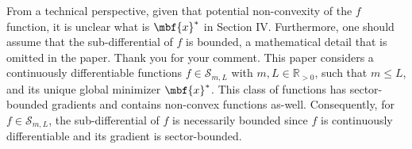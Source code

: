 \begin{rebuttal}[stuck]
    {%
    From a technical perspective, given that potential non-convexity of the $f$ function, it is unclear what is $\mbf{x}^{\ast}$ in Section IV\@. Furthermore, one should assume that the sub-differential of $f$ is bounded, a mathematical detail that is omitted in the paper.
    }%
    {%
        Thank you for your comment. This paper considers a continuously differentiable functions \(f \in \mathcal{S}_{m, L}\) with \(m, L \in \mathbb{R}_{>0}\), such that \(m \leq L\), and its unique global minimizer \(\mbf{x}^\ast\). This class of functions has sector-bounded gradients and contains non-convex functions as-well. Consequently, for \(f \in \mathcal{S}_{m, L}\), the sub-differential of \(f\) is necessarily bounded since \(f\) is continuously differentiable and its gradient is sector-bounded.
    }%
\end{rebuttal}
